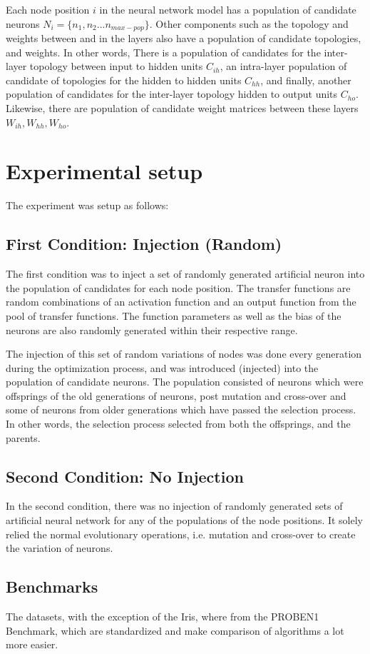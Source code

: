 \documentclass[12pt]{article} %
\begin{document}
Each node position $i$ in the neural network model has a population of candidate neurons $N_i =\{n_1,n_2...n_{max-pop} \}$. Other components such as the topology and weights between and in the layers also have a population of candidate topologies, and weights. In other words, There is a population of candidates for the inter-layer topology between input to hidden units $C_{ih}$, an intra-layer population of candidate of topologies for the hidden to hidden units $C_{hh}$, and finally, another population of candidates for the inter-layer topology  hidden to output units $C_{ho}$. Likewise, there are population of candidate weight matrices between these layers $W_{ih}, W_{hh}, W_{ho}$.
\section{Experimental setup}


The experiment was setup as follows:
\subsection{First Condition: Injection (Random)}
The first condition was to inject a set of randomly generated artificial neuron into the population of candidates for each node position. The transfer functions are random combinations of an activation function and an output function from the pool of transfer functions. The function parameters as well as the bias of the neurons are also randomly generated within their respective range. 

The injection of this set of random variations of nodes was done every generation during the optimization process, and was introduced (injected) into the population of candidate neurons. The population consisted of neurons which were offsprings of the old generations of neurons, post mutation and cross-over and some of neurons from older generations which have passed the selection process. In other words, the selection process selected from both the offsprings, and the parents.
\subsection{Second Condition: No Injection}
In the second condition, there was no injection of randomly generated sets of artificial neural network for any of the populations of the node positions. It solely relied the normal evolutionary operations, i.e. mutation and cross-over to create the variation of neurons. 
 \subsection{Benchmarks}
The datasets, with the exception of the Iris, where from the PROBEN1 Benchmark, which are standardized and make comparison of algorithms a lot more easier.
\end{document}
